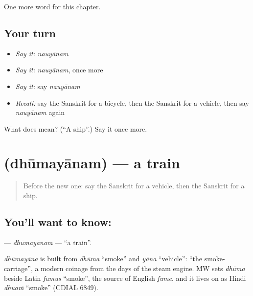 \begin{grammarlens}[title={What you've built}]
One more word for this chapter.
\end{grammarlens}

\subsection*{Your turn}
\begin{itemize}
\raggedright
  \item \emph{Say it:} \emph{nauyānam}
  \item \emph{Say it:} \emph{nauyānam}, once more
  \item \emph{Say it:} say \emph{nauyānam}
  \item \emph{Recall:} say the Sanskrit for a bicycle, then the Sanskrit for a vehicle, then say \emph{nauyānam} again
\end{itemize}

\begin{tcolorbox}[breakable,colback=teal!4,colframe=teal!35!black,title={Before you move on}]
What does  mean? (\textquotedblleft{}A ship\textquotedblright{}.) Say it once more.
\end{tcolorbox}
\section[\texorpdfstring{\sk{धूमयानम्} (dhūmayānam)}{धूमयानम् (dhūmayānam)}]{ (dhūmayānam) — a train}

\label{lesson:SA-C123-dhumayanam}



\begin{quote}
Before the new one: say the Sanskrit for a vehicle, then the Sanskrit for a ship.
\end{quote}

\subsection*{You'll want to know: }
\textbf{} — \emph{dhūmayānam} — \textquotedblleft{}a train\textquotedblright{}.

\begin{cousinweb}
\emph{dhūmayāna} is built from \emph{dhūma} \textquotedblleft{}smoke\textquotedblright{} and \emph{yāna} \textquotedblleft{}vehicle\textquotedblright{}: \textquotedblleft{}the smoke-carriage\textquotedblright{}, a modern coinage from the days of the steam engine. MW sets \emph{dhūma} beside Latin \emph{fumus} \textquotedblleft{}smoke\textquotedblright{}, the source of English \emph{fume}, and it lives on as Hindi \emph{dhuāṁ} \textquotedblleft{}smoke\textquotedblright{} (CDIAL 6849).
\end{cousinweb}

